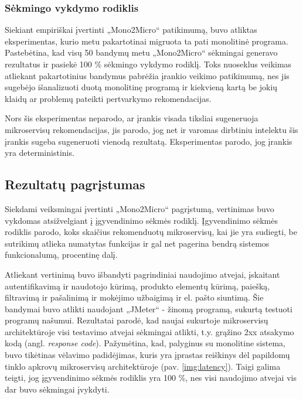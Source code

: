 \documentclass{VUMIFPSbakalaurinis}
\begin{document}
\subsubsection{Sėkmingo vykdymo rodiklis}
Siekiant empiriškai įvertinti „Mono2Micro“ patikimumą, buvo atliktas eksperimentas, kurio metu pakartotinai migruota ta pati monolitinė programa. Pastebėtina, kad visų 50 bandymų metu „Mono2Micro“ sėkmingai generavo rezultatus ir pasiekė 100 \% sėkmingo vykdymo rodiklį. Toks nuoseklus veikimas atliekant pakartotinius bandymus pabrėžia įrankio veikimo patikimumą, nes jis sugebėjo išanalizuoti duotą monolitinę programą ir kiekvieną kartą be jokių klaidų ar problemų pateikti pertvarkymo rekomendacijas.

Nors šis eksperimentas neparodo, ar įrankis visada tiksliai sugeneruoja mikroservisų rekomendacijas, jis parodo, jog net ir varomas dirbtiniu intelektu šis įrankis sugeba sugeneruoti vienodą rezultatą. Eksperimentas parodo, jog įrankis yra deterministinis.

\subsection{Rezultatų pagrįstumas}
Siekdami veiksmingai įvertinti „Mono2Micro“ pagrįstumą, vertinimas buvo vykdomas atsižvelgiant į įgyvendinimo sėkmės rodiklį. Įgyvendinimo sėkmės rodiklis parodo, koks skaičius rekomenduotų mikroservisų, kai jie yra sudiegti, be sutrikimų atlieka numatytas funkcijas ir gal net pagerina bendrą sistemos funkcionalumą, procentinę dalį.

Atliekant vertinimą buvo išbandyti pagrindiniai naudojimo atvejai, įskaitant autentifikavimą ir naudotojo kūrimą, produkto elementų kūrimą, paiešką, filtravimą ir pašalinimą ir mokėjimo užbaigimą ir el. pašto siuntimą. Šie bandymai buvo atlikti naudojant „JMeter“ - žinomą programą, sukurtą testuoti programų našumui. Rezultatai parodė, kad naujai sukurtoje mikroservisų architektūroje visi testavimo atvejai sėkmingai atlikti, t.y. grąžino 2xx atsakymo kodą (angl. \emph{response code}). Pažymėtina, kad, palyginus su monolitine sistema, buvo tikėtinas vėlavimo padidėjimas, kuris yra įprastas reiškinys dėl papildomų tinklo apkrovų mikroservisų architektūroje (pav. \ref{img:latency}). Taigi galima teigti, jog įgyvendinimo sėkmės rodiklis yra 100 \%, nes visi naudojimo atvejai vis dar buvo sėkmingai įvykdyti.
\end{document}
